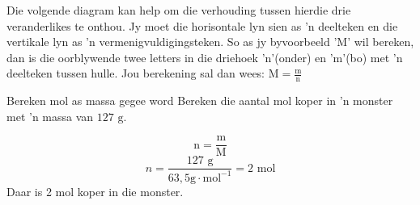       \label{m38717*id277605}
Die volgende diagram kan help om die verhouding tussen hierdie drie veranderlikes te onthou. Jy moet die horisontale lyn sien as  'n deelteken en die vertikale lyn as  'n vermenigvuldigingsteken. So as jy byvoorbeeld 'M' wil bereken, dan is die oorblywende twee letters in  die driehoek 'n'(onder) en 'm'(bo) met 'n deelteken tussen hulle. Jou berekening sal dan wees:
 $\text{M}=\frac{\text{m}}{\text{n}}$
      \label{m38717*id277613}
    \setcounter{subfigure}{0}
	\begin{figure}[H] %
\begin{center}
\end{center}
 \end{figure}       
      \par 
\label{m38717*secfhsst!!!underscore!!!id409}
      \noindent
      \begin{wex}{Bereken mol as massa gegee word}{
\label{m38717*probfhsst!!!underscore!!!id410}
      \label{m38717*id277635}Bereken die aantal mol koper in 'n monster met 'n massa van $127 \text{ g}$. 
      }
{
      \label{m38717*id277680}\nopagebreak\noindent{}
        
    \begin{equation*}
    \text{n}=\frac{\text{m}}{\text{M}}
      \end{equation*}
      \label{m38717*id277705}\nopagebreak\noindent{}
    \begin{equation*}
    n=\frac{127 \text{ g}}{63,5 \text{g} \cdot \text{mol}^{-1}}=2 \text{ mol}
      \end{equation*}
      \label{m38717*id277735}Daar is 2 mol koper in die monster.
}
    \end{wex}
    
